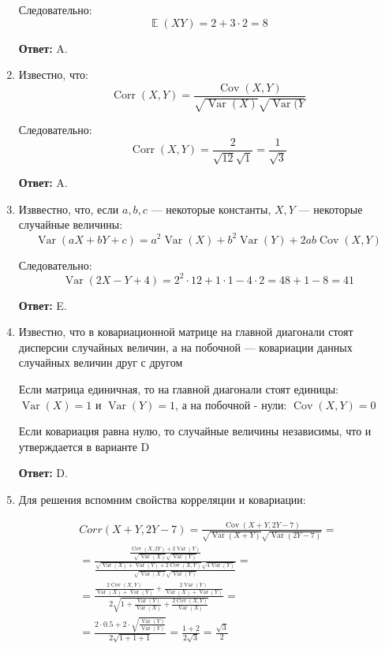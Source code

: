 \documentclass[a4paper]{article} %
\DeclareMathOperator{\Var}{Var}
\DeclareMathOperator{\Cov}{Cov}
\DeclareMathOperator{\Corr}{Corr}
\DeclareMathOperator{\E}{\mathbb{E}}
\begin{document}
\begin{enumerate}
    Следовательно:
    \[
    \E(XY) = 2 + 3\cdot2 = 8
    \]
    
    \textbf{Ответ:} A.
    
    
    \item 
    Известно, что:
    \[
    \Corr(X,Y) = \frac{\Cov(X,Y)}{\sqrt{\Var(X)}\sqrt{\Var(Y}}
    \]
    
    Следовательно:
    \[
    \Corr(X,Y) = \frac{2}{\sqrt{12}\sqrt{1}} = \frac{1}{\sqrt{3}}
    \]
    
    \textbf{Ответ:} A.
    
    
    \item
    Изввестно, что, если $a, b, c$ — некоторые константы, $X, Y$ — некоторые случайные величины:
    \[
    \Var(aX + bY + c) = a^2 \Var(X) + b^2 \Var(Y) + 2ab\Cov(X,Y)
    \]
    
    Следовательно:
    \[
    \Var(2X - Y + 4) = 2^2 \cdot 12 + 1 \cdot 1 - 4 \cdot 2 = 48 + 1 - 8 = 41
    \]
    
    \textbf{Ответ:} E.
    
    
    \item
    Известно, что в ковариационной матрице на главной диагонали стоят дисперсии случайных величин, а на побочной — ковариации данных случайных величин друг с другом
    
    Если матрица единичная, то на главной диагонали стоят единицы: $\Var(X) = 1$ и $\Var(Y) = 1$, а на побочной - нули:  $\Cov(X,Y) = 0$
    
    Если ковариация равна нулю, то случайные величины независимы, что и утверждается в варианте D
    
    \textbf{Ответ:} D.
    

    \item
    Для решения вспомним свойства корреляции и ковариации:
    
    \[
    \begin{gathered} Corr(X+Y, 2Y-7) = \frac{\Cov(X+Y, 2Y-7)}{\sqrt{\Var(X+Y)}\sqrt{\Var(2Y-7)}} = \\ 
    =\frac{\frac{\Cov(X, 2Y) + 2 \Var(Y)}{\sqrt{\Var(X)}\sqrt{\Var(Y)}}}{\frac{\sqrt{\Var(X) + \Var(Y) + 2\Cov(X,Y)}\sqrt{4\Var(Y)}}{\sqrt{\Var(X)}\sqrt{\Var(Y)}}} = \\ 
    =\frac{\frac{2\Cov(X, Y)}{\Var(X) + \Var(Y)} + \frac{2 \Var(Y)}{\Var(X) + \Var(Y)}}{2\sqrt{1 + \frac{\Var(Y)}{\Var(X)} + \frac{2\Cov(X,Y)}{\Var(X)}}} = \\ 
    =\frac{2 \cdot 0.5 + 2 \cdot \sqrt{\frac{\Var(Y)}{\Var(Y)}}}{2\sqrt{1 + 1 + 1}} = \frac{1 + 2}{2 \sqrt{3}} = \frac{\sqrt{3}}{2} \end{gathered} 
    \]
    

\end{enumerate}
\end{document}
